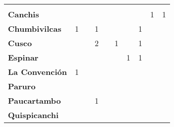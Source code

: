 \begin{tabular}{lccccccccc}
	&\cellcolor[HTML]{FCC46C}\\
	\textbf{Canchis}
	&\cellcolor[HTML]{FCC46C}                            
	&\cellcolor[HTML]{FCC46C} 		  			&\cellcolor[HTML]{FCC46C} 
	&\cellcolor[HTML]{FCC46C}   				&\cellcolor[HTML]{FCC46C} 							&\cellcolor[HTML]{FCC46C}					&\cellcolor[HTML]{FCC46C} 		
	&1											&1\\
	\textbf{Chumbivilcas}                      
	&1                  						&\cellcolor[HTML]{FCC46C}       			&1
	&\cellcolor[HTML]{FCC46C}   			    &\cellcolor[HTML]{FCC46C}
	&\cellcolor[HTML]{FCC46C}					&1			
	&\cellcolor[HTML]{FCC46C}					&\cellcolor[HTML]{FCC46C}\\
	\textbf{Cusco}                             
	&\cellcolor[HTML]{FCC46C}                   &\cellcolor[HTML]{FCC46C}    	 			&2 											&\cellcolor[HTML]{FCC46C} 		 			&1											
	&\cellcolor[HTML]{FCC46C}					&1											
	&\cellcolor[HTML]{FCC46C}					&\cellcolor[HTML]{FCC46C}\\
	\textbf{Espinar}       					                 						   
	&\cellcolor[HTML]{FCC46C}                   &\cellcolor[HTML]{FCC46C}  		 			&\cellcolor[HTML]{FCC46C} 
	&\cellcolor[HTML]{FCC46C} 					&\cellcolor[HTML]{FCC46C} 		 
	&1											&1									
	&\cellcolor[HTML]{FCC46C}				    &\cellcolor[HTML]{FCC46C}\\
	\textbf{La Convención}                      
	&1                   						&\cellcolor[HTML]{FCC46C}              		&\cellcolor[HTML]{FCC46C} 			
	&\cellcolor[HTML]{FCC46C}					&\cellcolor[HTML]{FCC46C}  					&\cellcolor[HTML]{FCC46C} 		            &\cellcolor[HTML]{FCC46C} 					
	&\cellcolor[HTML]{FCC46C} 					&\cellcolor[HTML]{FCC46C}\\
	\textbf{Paruro}                            
	&\cellcolor[HTML]{FCC46C}              	    &\cellcolor[HTML]{FCC46C}        			&\cellcolor[HTML]{FCC46C}                   &\cellcolor[HTML]{FCC46C}   				&\cellcolor[HTML]{FCC46C} 					&\cellcolor[HTML]{FCC46C}		 			&\cellcolor[HTML]{FCC46C}					&\cellcolor[HTML]{FCC46C}
	&\cellcolor[HTML]{FCC46C}\\
	\textbf{Paucartambo}               		    
	&\cellcolor[HTML]{FCC46C}                   &\cellcolor[HTML]{FCC46C}                   
	&1											&\cellcolor[HTML]{FCC46C} 					&\cellcolor[HTML]{FCC46C}					&\cellcolor[HTML]{FCC46C}					
	&\cellcolor[HTML]{FCC46C}					&\cellcolor[HTML]{FCC46C}                   &\cellcolor[HTML]{FCC46C} \\
	\textbf{Quispicanchi}                                         	                  

\end{tabular}
